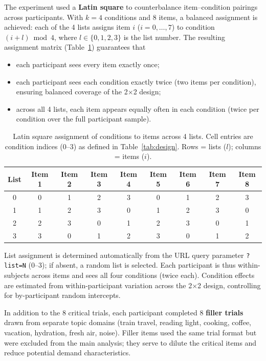 \documentclass[12pt]{article}
\begin{document}
The experiment used a \textbf{Latin square} to counterbalance item--condition
pairings across participants.
With $k = 4$ conditions and 8 items, a balanced assignment is achieved:
each of the 4 lists assigns item $i$ ($i = 0,\ldots,7$) to condition
$(i + l)\bmod 4$, where $l \in \{0,1,2,3\}$ is the list number.
The resulting assignment matrix (Table~\ref{tab:ls}) guarantees that
\begin{itemize}
  \item each participant sees every item exactly once;
  \item each participant sees each condition exactly twice (two items per
        condition), ensuring balanced coverage of the 2$\times$2 design;
  \item across all 4 lists, each item appears equally often in each
        condition (twice per condition over the full participant sample).
\end{itemize}

\begin{table}[ht]
\centering
\caption{Latin square assignment of conditions to items across 4 lists.
  Cell entries are condition indices (0--3) as defined in
  Table~\ref{tab:design}.
  Rows = lists ($l$); columns = items ($i$).}
\label{tab:ls}
\small
\begin{tabular}{ccccccccc}
\toprule
\textbf{List} &
\textbf{Item 1} & \textbf{Item 2} & \textbf{Item 3} & \textbf{Item 4} &
\textbf{Item 5} & \textbf{Item 6} & \textbf{Item 7} & \textbf{Item 8} \\
\midrule
0 & 0 & 1 & 2 & 3 & 0 & 1 & 2 & 3 \\
1 & 1 & 2 & 3 & 0 & 1 & 2 & 3 & 0 \\
2 & 2 & 3 & 0 & 1 & 2 & 3 & 0 & 1 \\
3 & 3 & 0 & 1 & 2 & 3 & 0 & 1 & 2 \\
\bottomrule
\end{tabular}
\end{table}

\noindent List assignment is determined automatically from the URL query
parameter \texttt{?list=N} (0--3); if absent, a random list is selected.
Each participant is thus within-subjects across items and sees all four
conditions (twice each). Condition effects are estimated from within-participant
variation across the 2$\times$2 design, controlling for by-participant
random intercepts.

In addition to the 8 critical trials, each participant completed 8
\textbf{filler trials} drawn from separate topic domains (train travel,
reading light, cooking, coffee, vacation, hydration, fresh air, noise).
Filler items used the same trial format but were excluded from the
main analysis; they serve to dilute the critical items and reduce
potential demand characteristics.
\end{document}
